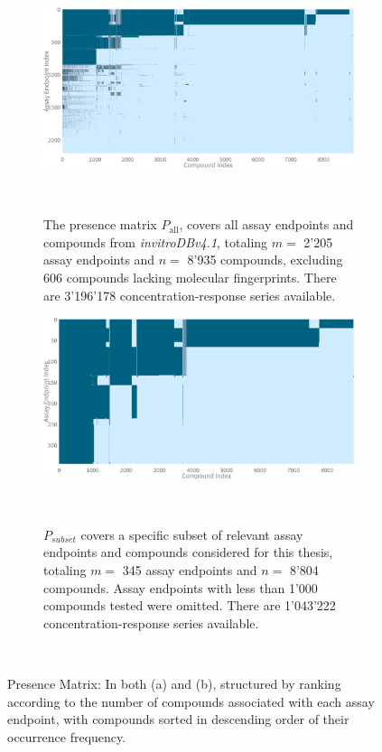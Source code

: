 \begin{figure}[h]
    \centering
    \begin{subfigure}[b]{0.48\textwidth}
        \centering
        \includegraphics[width=\textwidth]{figures/presence_matrix_all.png}
        \caption{The presence matrix $P_{\text{all}}$, covers all assay endpoints and compounds from \emph{invitroDBv4.1}, totaling $m =$ 2'205 assay endpoints and $n =$ 8'935 compounds, excluding 606 compounds lacking molecular fingerprints. There are 3'196'178 concentration-response series available.}
    ~\label{fig:presence_matrix_all}
    \end{subfigure}
    \hfill
    \begin{subfigure}[b]{0.48\textwidth}
        \centering
        \includegraphics[width=\textwidth]{figures/presence_matrix_subset.png}
        \caption{$P_{subset}$ covers a specific subset of relevant assay endpoints and compounds considered for this thesis, totaling $m =$ 345 assay endpoints and $n =$ 8'804 compounds. Assay endpoints with less than 1'000 compounds tested were omitted. There are 1'043'222 concentration-response series available.}
        ~\label{fig:presence_matrix_subset}
    \end{subfigure}
    \caption{Presence Matrix: In both (a) and (b), structured by ranking according to the number of compounds associated with each assay endpoint, with compounds sorted in descending order
    of their occurrence frequency.}
    ~\label{fig:presence_matrix}
\end{figure}


